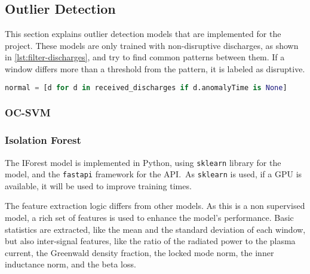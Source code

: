 \subsection{Outlier Detection}

This section explains outlier detection models that are implemented for the project. These models are only trained with non-disruptive discharges, as shown in \autoref{lst:filter-discharges}, and try to find common patterns between them. If a window differs more than a threshold from the pattern, it is labeled as disruptive.

\begin{lstlisting}[language=Python, caption={Filtering discharges on outlier detection models. Extracted from \ac{IForest} repository \autocite{OutlierClassifierPy_iforestPython}.}, label={lst:filter-discharges}]
normal = [d for d in received_discharges if d.anomalyTime is None]
\end{lstlisting}

\subsubsection{\acs{OC-SVM}}

\subsubsection{Isolation Forest}\label{sec:iforest-implementation}

The \ac{IForest} model is implemented in Python, using \texttt{sklearn} library for the model, and the \texttt{fastapi} framework for the API.\ As \texttt{sklearn} is used, if a \ac{GPU} is available, it will be used to improve training times.

The feature extraction logic differs from other models. As this is a non supervised model, a rich set of features is used to enhance the model's performance. Basic statistics are extracted, like the mean and the standard deviation of each window, but also inter-signal features, like the ratio of the radiated power to the plasma current, the Greenwald density fraction, the locked mode norm, the inner inductance norm, and the beta loss.

